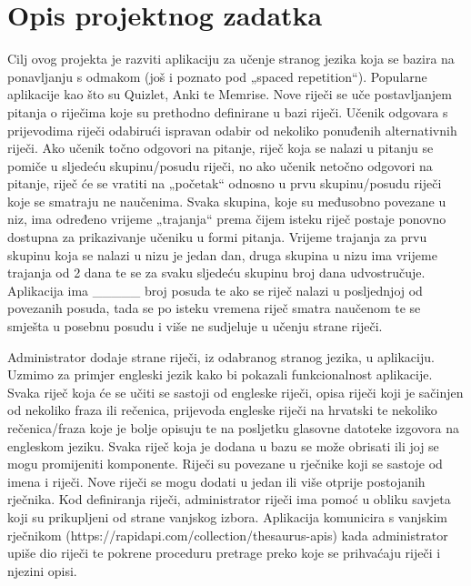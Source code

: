 \chapter{Opis projektnog zadatka}
		
Cilj ovog projekta je razviti aplikaciju za učenje stranog jezika koja se bazira na ponavljanju s odmakom (još i poznato pod „spaced repetition“). Popularne aplikacije kao što su Quizlet, Anki te Memrise. Nove riječi se uče postavljanjem pitanja o riječima koje su prethodno definirane u bazi riječi. Učenik odgovara s prijevodima riječi odabirući ispravan odabir od nekoliko ponuđenih alternativnih riječi. Ako učenik točno odgovori na pitanje, riječ koja se nalazi u pitanju se pomiče u sljedeću skupinu/posudu riječi, no ako učenik netočno odgovori na pitanje, riječ će se vratiti na „početak“ odnosno u prvu skupinu/posudu riječi koje se smatraju ne naučenima. Svaka skupina, koje su međusobno povezane u niz, ima određeno vrijeme „trajanja“ prema čijem isteku riječ postaje ponovno dostupna za prikazivanje učeniku u formi pitanja. Vrijeme trajanja za prvu skupinu koja se nalazi u nizu je jedan dan, druga skupina u nizu ima vrijeme trajanja od 2 dana te se za svaku sljedeću skupinu broj dana udvostručuje. Aplikacija ima _____ broj posuda te ako se riječ nalazi u posljednjoj od povezanih posuda, tada se po isteku vremena riječ smatra naučenom te se smješta u posebnu posudu i više ne sudjeluje u učenju strane riječi. 

Administrator dodaje strane riječi, iz odabranog stranog jezika, u aplikaciju. Uzmimo za primjer engleski jezik kako bi pokazali funkcionalnost aplikacije. Svaka riječ koja će se učiti se sastoji od engleske riječi, opisa riječi koji je sačinjen od nekoliko fraza ili rečenica, prijevoda engleske riječi na hrvatski te nekoliko rečenica/fraza koje je bolje opisuju te na posljetku glasovne datoteke izgovora na engleskom jeziku. Svaka riječ koja je dodana u bazu se može obrisati ili joj se mogu promijeniti komponente. Riječi su povezane u rječnike koji se sastoje od imena i riječi. Nove riječi se mogu dodati u jedan ili više otprije postojanih rječnika. Kod definiranja riječi, administrator riječi ima pomoć u obliku savjeta koji su prikupljeni od strane vanjskog izbora. Aplikacija komunicira s vanjskim rječnikom (https://rapidapi.com/collection/thesaurus-apis) kada administrator upiše dio riječi te pokrene proceduru pretrage preko koje se prihvaćaju riječi i njezini opisi. 

